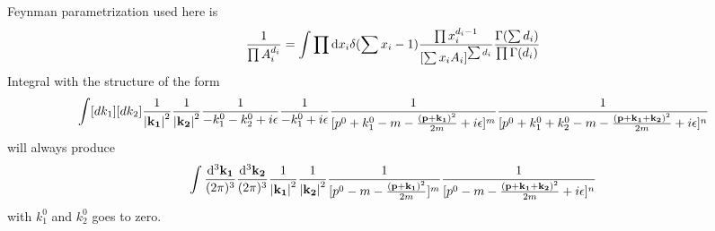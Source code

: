 \documentclass{article}
\begin{document}
\clearpage
\begin{appendices}
  Feynman parametrization used here is
  \begin{align}
	\frac{1}{\prod A_i^{d_i}}=\int\prod \dd x_i \delta(\sum x_i-1)\frac{\prod x_i^{d_i-1}}{\bqty{\sum x_iA_i}^{\sum d_i}}\frac{\Gamma(\sum d_i)}{\prod\Gamma(d_i)}
	\label{FEYNMANPARA}
  \end{align}
  Integral with the structure of the form 
  \begin{align*}
	\int[dk_1][dk_2]\frac{1}{\vb{\abs{k_1}}^2}\frac{1}{\vb{\abs{k_2}}^2}\frac{1}{-k_1^0-k_2^0+i\epsilon}\frac{1}{-k_1^0+i\epsilon}\frac{1}{[p^0+k_1^0-m-\frac{\vb{(p+k_1)}^2}{2m}+i\epsilon]^m}\frac{1}{[p^0+k_1^0+k_2^0-m-\frac{\vb{(p+k_1+k_2)}^2}{2m}+i\epsilon]^n}
  \end{align*}
  will always produce
  \begin{align*}
	\int\frac{\dd^3\vb{k_1}}{(2\pi)^3}\frac{\dd^3\vb{k_2}}{(2\pi)^3}\frac{1}{\vb{\abs{k_1}}^2}\frac{1}{\vb{\abs{k_2}}^2}\frac{1}{[p^0-m-\frac{\vb{(p+k_1)}^2}{2m}]^m}\frac{1}{[p^0-m-\frac{\vb{(p+k_1+k_2)}^2}{2m}+i\epsilon]^n}
  \end{align*}
  with $k_1^0$ and $k_2^0$ goes to zero.


\end{appendices}
\end{document}
